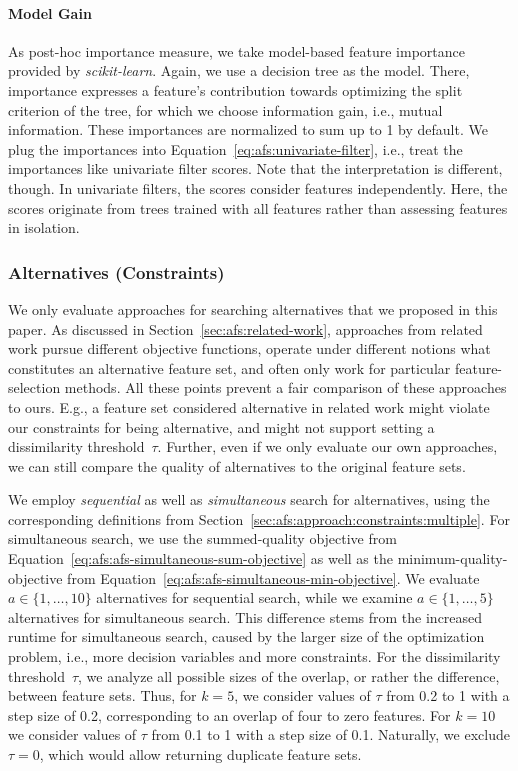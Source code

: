 \documentclass{article}
\theoremstyle{definition}
\begin{document}
\paragraph{Model Gain}

As post-hoc importance measure, we take model-based feature importance provided by \emph{scikit-learn}.
Again, we use a decision tree as the model.
There, importance expresses a feature's contribution towards optimizing the split criterion of the tree, for which we choose information gain, i.e., mutual information.
These importances are normalized to sum up to 1 by default.
We plug the importances into Equation~\ref{eq:afs:univariate-filter}, i.e., treat the importances like univariate filter scores.
Note that the interpretation is different, though.
In univariate filters, the scores consider features independently.
Here, the scores originate from trees trained with all features rather than assessing features in isolation.

\subsubsection{Alternatives (Constraints)}
\label{sec:afs:experimental-design:approaches:alternatives}

We only evaluate approaches for searching alternatives that we proposed in this paper.
As discussed in Section~\ref{sec:afs:related-work}, approaches from related work pursue different objective functions, operate under different notions what constitutes an alternative feature set, and often only work for particular feature-selection methods.
All these points prevent a fair comparison of these approaches to ours.
E.g., a feature set considered alternative in related work might violate our constraints for being alternative, and might not support setting a dissimilarity threshold~$\tau$.
Further, even if we only evaluate our own approaches, we can still compare the quality of alternatives to the original feature sets.

We employ \emph{sequential} as well as \emph{simultaneous} search for alternatives, using the corresponding definitions from Section~\ref{sec:afs:approach:constraints:multiple}.
For simultaneous search, we use the summed-quality objective from Equation~\ref{eq:afs:afs-simultaneous-sum-objective} as well as the minimum-quality-objective from Equation~\ref{eq:afs:afs-simultaneous-min-objective}.
We evaluate $a \in \{1, \dots, 10\}$ alternatives for sequential search, while we examine $a \in \{1, \dots, 5\}$ alternatives for simultaneous search.
This difference stems from the increased runtime for simultaneous search, caused by the larger size of the optimization problem, i.e., more decision variables and more constraints.
For the dissimilarity threshold~$\tau$, we analyze all possible sizes of the overlap, or rather the difference, between feature sets.
Thus, for $k=5$, we consider values of $\tau$ from 0.2 to 1 with a step size of 0.2, corresponding to an overlap of four to zero features.
For $k=10$ we consider values of $\tau$ from 0.1 to 1 with a step size of 0.1.
Naturally, we exclude $\tau = 0$, which would allow returning duplicate feature sets.
\end{document}
